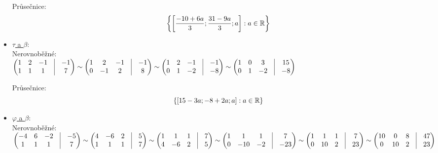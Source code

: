 \begin{itemize}
		Průsečnice:
		 $$ 
		  \left\{{\left[{\frac{-10+6 a}{3}; \frac{31-9 a}{3}; a}\right]:a \in \mathbb{R}}\right\} 
		   $$ 
	\item \underline{$\tau$ a $\beta$}: \\
		Nerovnoběžné:\\
		 $ \begin{pmatrix}
			 1 &2 &-1 &\vline& -1 \\ 
			 1 &1 &1 &\vline& 7 \\ 
		 \end{pmatrix}
		 \sim
		 \begin{pmatrix}
			 1 &2 &-1 &\vline& -1 \\ 
			 0 &-1 &2 &\vline& 8 \\ 
		 \end{pmatrix}
		 \sim
		 \begin{pmatrix}
			 1 &2 &-1 &\vline& -1 \\ 
			 0 &1 &-2 &\vline& -8 \\ 
		 \end{pmatrix}
		 \sim
		 \begin{pmatrix}
			 1 &0 &3 &\vline& 15 \\ 
			 0 &1 &-2 &\vline& -8 \\ 
		 \end{pmatrix}
		 $


		Průsečnice:
		 $$ 
		 \left\{{\left[{15-3 a; -8+2 a; a}\right]:a \in \mathbb{R}}\right\} 
		   $$ 
	\item \underline{$\varphi$ a $\beta$}: \\
		Nerovnoběžné:\\
		 $ \begin{pmatrix}
			 -4 &6 &-2 &\vline& -5 \\ 
			 1 &1 &1 &\vline& 7 \\ 
		 \end{pmatrix}
		 \sim
		 \begin{pmatrix}
			 4 &-6 &2 &\vline& 5 \\ 
			 1 &1 &1 &\vline& 7 \\ 
		 \end{pmatrix}
		 \sim
		 \begin{pmatrix}
			 1 &1 &1 &\vline& 7 \\ 
			 4 &-6 &2 &\vline& 5 \\ 
		 \end{pmatrix}
		 \sim
		 \begin{pmatrix}
			 1 &1 &1 &\vline& 7 \\ 
			 0 &-10 &-2 &\vline& -23 \\ 
		 \end{pmatrix}
		 \sim
		 \begin{pmatrix}
			 1 &1 &1 &\vline& 7 \\ 
			 0 &10 &2 &\vline& 23 \\ 
		 \end{pmatrix}
		 \sim
		 \begin{pmatrix}
			 10 &0 &8 &\vline& 47 \\ 
			 0 &10 &2 &\vline& 23 \\ 
		 \end{pmatrix}
		 $



\end{itemize}

